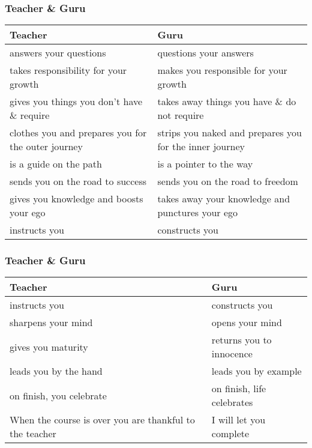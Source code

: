 \begin{frame}
\frametitle{Teacher \& Guru}
\begin{tabular}{p{} | p{}}
Teacher & Guru \pause \\
\hline \hline
answers your questions  & 
questions your answers \pause   \\ \hline
takes responsibility for your growth \pause  & 
makes you responsible for your growth  \pause \\ \hline

gives you things you don't have \& require  &
takes away things you have \&  do not require  \\ \hline

clothes you and prepares you for the outer journey  &
strips you naked and prepares you for the inner journey  \\ \hline

is a guide on the path  &
is a pointer to the way  \\ \hline

sends you on the road to success  &
sends you on the road to freedom  \\ \hline

gives you knowledge and boosts your ego  &
takes away your knowledge and punctures your ego  \\ \hline

instructs you  &
constructs you  \\ \hline

\end{tabular}
\end{frame}

\begin{frame}
\frametitle{Teacher \& Guru}
\begin{tabular}{p{} | l}

Teacher & Guru \\ 
\hline \hline
instructs you  &
constructs you  \\ \hline

sharpens your mind  &
opens your mind  \\ \hline

gives you maturity  &
returns you to innocence  \\ \hline

leads you by the hand  &
leads you by example  \\ \hline

on finish, you celebrate &  
on finish, life celebrates  \\ \hline

When the course is over you are thankful to the teacher  &
I will let you complete \\ \hline
\end{tabular}
\end{frame}
